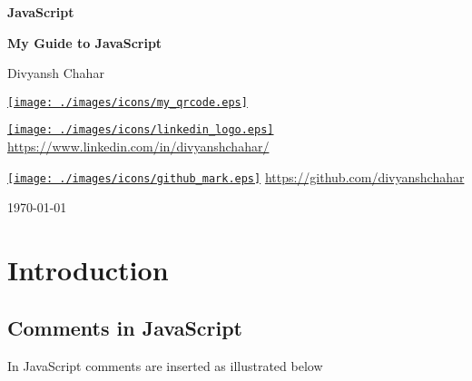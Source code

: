 \documentclass[twoside,12pt]{report}  %
\begin{document}
	\begin{titlepage}
		\begin{center}
			{\LARGE \textbf{JavaScript}}\\
			
			\hrulefill
			
			\textbf{My Guide to JavaScript} 
			
			\null
			
			Divyansh Chahar
			
			\vfill
			
			\href{https://www.linkedin.com/in/divyanshchahar/}{\texttt{[image: ./images/icons/my\_qrcode.eps]}}
			
			\null
			
			\href{https://www.linkedin.com/in/divyanshchahar/}{\texttt{[image: ./images/icons/linkedin\_logo.eps]}}
			\href{https://www.linkedin.com/in/divyanshchahar/}{https://www.linkedin.com/in/divyanshchahar/}
			
			\null
			
			\href{https://www.linkedin.com/in/divyanshchahar/}{\texttt{[image: ./images/icons/github\_mark.eps]}}
			\href{https://github.com/divyanshchahar}{https://github.com/divyanshchahar}
			
			\vfill
			
			\today
			
		\end{center}
	\end{titlepage}
	
	\restoregeometry
	
	
	\chapter{Introduction}
	
	\section{Comments in JavaScript}

	In JavaScript comments are inserted as illustrated below
	
	\begin{listing}[H]
		\inputminted[linenos, autogobble, bgcolor=myjsbackground]{JavaScript}{../codes/js_comments.js}
	\end{listing}
\end{document}

